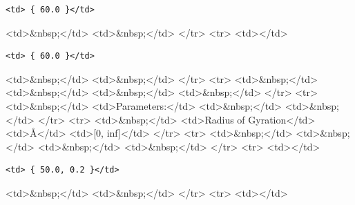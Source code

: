 \begin{verbatim}
<td> { 60.0 }</td>
\end{verbatim}

\textless{}td\textgreater{}\&nbsp;\textless{}/td\textgreater{} \textless{}td\textgreater{}\&nbsp;\textless{}/td\textgreater{} \textless{}/tr\textgreater{} \textless{}tr\textgreater{} \textless{}td\textgreater{}\textless{}/td\textgreater{}

\begin{verbatim}
<td> { 60.0 }</td>
\end{verbatim}

\textless{}td\textgreater{}\&nbsp;\textless{}/td\textgreater{} \textless{}td\textgreater{}\&nbsp;\textless{}/td\textgreater{} \textless{}/tr\textgreater{} \textless{}tr\textgreater{} \textless{}td\textgreater{}\&nbsp;\textless{}/td\textgreater{} \textless{}td\textgreater{}\&nbsp;\textless{}/td\textgreater{} \textless{}td\textgreater{}\&nbsp;\textless{}/td\textgreater{} \textless{}td\textgreater{}\&nbsp;\textless{}/td\textgreater{} \textless{}/tr\textgreater{} \textless{}tr\textgreater{} \textless{}td\textgreater{}\&nbsp;\textless{}/td\textgreater{} \textless{}td\textgreater{}Parameters:\textless{}/td\textgreater{} \textless{}td\textgreater{}\&nbsp;\textless{}/td\textgreater{} \textless{}td\textgreater{}\&nbsp;\textless{}/td\textgreater{} \textless{}/tr\textgreater{} \textless{}tr\textgreater{} \textless{}td\textgreater{}\&nbsp;\textless{}/td\textgreater{} \textless{}td\textgreater{}Radius of Gyration\textless{}/td\textgreater{} \textless{}td\textgreater{}\AA{}\textless{}/td\textgreater{} \textless{}td\textgreater{}[0, inf]\textless{}/td\textgreater{} \textless{}/tr\textgreater{} \textless{}tr\textgreater{} \textless{}td\textgreater{}\&nbsp;\textless{}/td\textgreater{} \textless{}td\textgreater{}\&nbsp;\textless{}/td\textgreater{} \textless{}td\textgreater{}\&nbsp;\textless{}/td\textgreater{} \textless{}td\textgreater{}\&nbsp;\textless{}/td\textgreater{} \textless{}/tr\textgreater{} \textless{}tr\textgreater{} \textless{}td\textgreater{}\textless{}/td\textgreater{}

\begin{verbatim}
<td> { 50.0, 0.2 }</td>
\end{verbatim}

\textless{}td\textgreater{}\&nbsp;\textless{}/td\textgreater{} \textless{}td\textgreater{}\&nbsp;\textless{}/td\textgreater{} \textless{}/tr\textgreater{} \textless{}tr\textgreater{} \textless{}td\textgreater{}\textless{}/td\textgreater{}

